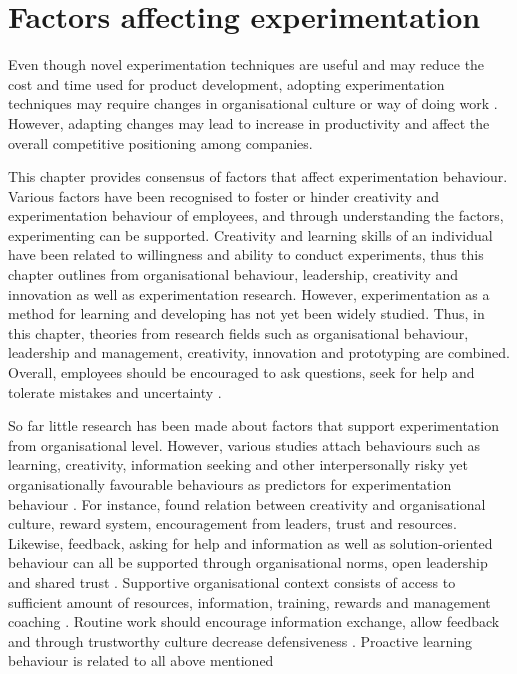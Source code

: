 \chapter{Factors affecting experimentation}
Even though novel experimentation techniques are useful and may reduce the cost and time used for product development, adopting experimentation techniques may require changes in organisational culture or way of doing work \citep{thomke1998modes}. However, adapting changes may lead to increase in productivity and affect the overall competitive positioning among companies. 

This chapter provides consensus of factors that affect experimentation behaviour. Various factors have been recognised to foster or hinder creativity and experimentation behaviour of employees, and through understanding the factors, experimenting can be supported. Creativity and learning skills of an individual have been related to willingness and ability to conduct experiments, thus this chapter outlines from organisational behaviour, leadership, creativity and innovation as well as experimentation research. However, experimentation as a method for learning and developing has not yet been widely studied. Thus, in this chapter, theories from research fields such as organisational behaviour, leadership and management, creativity, innovation and prototyping are combined. Overall, employees should be encouraged to ask questions, seek for help and tolerate mistakes and uncertainty \citep{edmondson1999psychological}.

So far little research has been made about factors that support experimentation from organisational level. However, various studies attach behaviours such as learning, creativity, information seeking and other interpersonally risky yet organisationally favourable behaviours as predictors for experimentation behaviour \citep{lee2004mixed,amabile1996,argyris1994good,edmondson1996learning,edmondson2003speaking}. For instance, \citet{amabile1996assessing} found relation between creativity and organisational culture, reward system, encouragement from leaders, trust and resources. Likewise, feedback, asking for help and information as well as solution-oriented behaviour can all be supported through organisational norms, open leadership and shared trust \citep{ashford1992conveying,ashford1998out,lee1997going,morrison1993newcomer}. Supportive organisational context consists of access to sufficient amount of resources, information, training, rewards and management coaching \citep{edmondson1996learning}. Routine work should encourage information exchange, allow feedback and through trustworthy culture decrease defensiveness \citep{argyris1994good}. Proactive learning behaviour is related to all above mentioned \citep{edmondson2003speaking}

